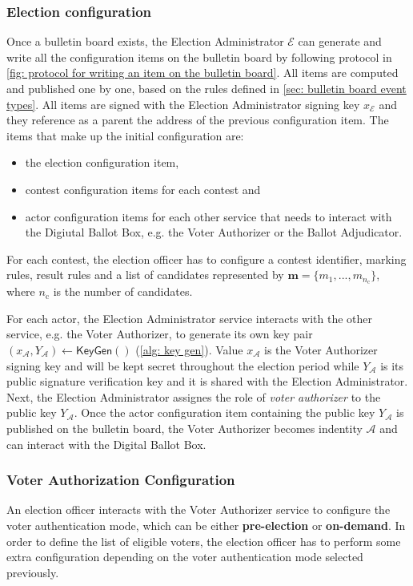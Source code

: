 \subsubsection{Election configuration} \label{sec: election configuration}
Once a bulletin board exists, the Election Administrator $\mathcal{E}$ can generate and write all the configuration items on the bulletin board by following protocol in \cref{fig: protocol for writing an item on the bulletin board}. All items are computed and published one by one, based on the rules defined in \cref{sec: bulletin board event types}. All items are signed with the Election Administrator signing key $x_\mathcal{E}$ and they reference as a parent the address of the previous configuration item. The items that make up the initial configuration are:
\begin{itemize}
    \item the election configuration item,
    \item contest configuration items for each contest and
    \item actor configuration items for each other service that needs to interact with the Digiutal Ballot Box, e.g. the Voter Authorizer or the Ballot Adjudicator.
\end{itemize}

For each contest, the election officer has to configure a contest identifier, marking rules, result rules and a list of candidates represented by $\boldsymbol{m} = \{ m_1, ..., m_{n_\mathrm{c}} \}$, where $n_\mathrm{c}$ is the number of candidates.

For each actor, the Election Administrator service interacts with the other service, e.g. the Voter Authorizer, to generate its own key pair $(x_\mathcal{A}, Y_\mathcal{A}) \gets \mathsf{KeyGen}()$ (\cref{alg: key gen}). Value $x_\mathcal{A}$ is the Voter Authorizer signing key and will be kept secret throughout the election period while $Y_\mathcal{A}$ is its public signature verification key and it is shared with the Election Administrator. Next, the Election Administrator assignes the role of \textit{voter authorizer} to the public key $Y_\mathcal{A}$. Once the actor configuration item containing the public key $Y_\mathcal{A}$ is published on the bulletin board, the Voter Authorizer becomes indentity $\mathcal{A}$ and can interact with the Digital Ballot Box.


\subsubsection{Voter Authorization Configuration} \label{sec: voter authorization configuration}
An election officer interacts with the Voter Authorizer service to configure the voter authentication mode, which can be either \textbf{pre-election} or \textbf{on-demand}. In order to define the list of eligible voters, the election officer has to perform some extra configuration depending on the voter authentication mode selected previously.

